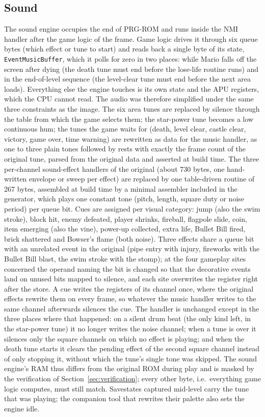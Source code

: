 \documentclass{article}
\begin{document}
\subsection{Sound}
\label{sec:sound}

The sound engine occupies the end of PRG-ROM and runs inside the NMI handler after the game logic
of the frame. Game logic drives it through six queue bytes (which effect or tune to start) and reads
back a single byte of its state, \texttt{EventMusicBuffer}, which it polls for zero in two places:
while Mario falls off the screen after dying (the death tune must end before the lose-life routine
runs) and in the end-of-level sequence (the level-clear tune must end before the next area loads).
Everything else the engine touches is its own state and the APU registers, which the CPU cannot
read. The audio was therefore simplified under the same three constraints as the image. The six
area tunes are replaced by silence through the table from which the game selects them; the
star-power tune becomes a low continuous hum; the tunes the game waits for (death, level clear,
castle clear, victory, game over, time warning) are rewritten as data for the music
handler, as one to three plain tones followed by rests with exactly the frame count of the original
tune, parsed from the original data and asserted at build time. The three per-channel sound-effect
handlers of the original (about 730 bytes, one hand-written envelope or sweep per effect) are
replaced by one table-driven routine of 267 bytes, assembled at build time by a minimal assembler
included in the generator, which plays one constant tone (pitch, length, square duty or noise
period) per queue bit. Cues are assigned per visual category: jump (also the swim stroke), block
hit, enemy defeated, player shrinks, fireball, flagpole slide, coin, item emerging (also the vine),
power-up collected, extra life, Bullet Bill fired, brick shattered and Bowser's flame (both noise).
Three effects share a queue bit with an unrelated event in the original (pipe entry with injury,
fireworks with the Bullet Bill blast, the swim stroke with the stomp); at the four gameplay sites
concerned the operand naming the bit is changed so that the decorative events land on unused bits
mapped to silence, and each site overwrites the register right after the store. A cue writes the
registers of its channel once, where the original effects rewrite them on every frame, so whatever
the music handler writes to the same channel afterwards silences the cue. The handler is unchanged
except in the three places where that happened: on a silent drum beat (the only kind left, in the
star-power tune) it no longer writes the noise channel; when a tune is over it silences only the
square channels on which no effect is playing; and when the death tune starts it clears the
pending effect of the second square channel instead of only stopping it, without which the tune's
single tone was skipped. The sound engine's
RAM thus differs from the original ROM during play and is masked by the verification of
Section~\ref{sec:verification}; every other byte, i.e.\ everything game logic computes, must still
match. Savestates captured mid-level carry the tune that was playing; the companion tool that
rewrites their palette also sets the engine idle.
\end{document}

